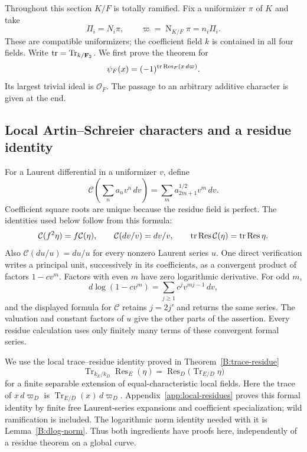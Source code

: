 \documentclass[11pt]{amsart}
\theoremstyle{definition}
\theoremstyle{remark}
\newcommand{\F}{\mathbf F}
\newcommand{\Tr}{\operatorname{Tr}}
\newcommand{\Nm}{\operatorname{N}}
\newcommand{\Res}{\operatorname{Res}}
\newcommand{\OO}{\mathcal O}\newcommand{\pp}{\mathfrak p}\newcommand{\PP}{\mathfrak P}
\newcommand{\Cart}{\mathcal C}\newcommand{\muq}{\mu}
\begin{document}
Throughout this section $K/F$ is totally ramified.
Fix a uniformizer $\pi$ of $K$ and take
\begin{equation}\label{D:EQ:compatiblepi}
 \Pi_i=N_i\pi,\qquad \varpi=\Nm_{K/F}\pi=n_i\Pi_i.
\end{equation}
These are compatible uniformizers; the coefficient field $k$ is contained
in all four fields. Write $\tr=\Tr_{k/\F_2}$.
We first prove the theorem for
\begin{equation}\label{D:EQ:canonicalpsi}
 \psi_F(x)=(-1)^{\tr\Res_F(x\,d\varpi)}.
\end{equation}
Its largest trivial ideal is $\OO_F$. The passage to an arbitrary
additive character is given at the end.

\subsection{Local Artin--Schreier characters and a residue identity}
For a Laurent differential in a uniformizer $v$, define
\[
 \Cart\left(\sum_n a_nv^n\,dv\right)
       =\sum_m a_{2m+1}^{1/2}v^m\,dv.
\]
Coefficient square roots are unique because the residue field is perfect.
The identities used below follow from this formula:
\begin{equation}\label{D:EQ:Cartier}
 \Cart(f^2\eta)=f\Cart(\eta),\qquad
 \Cart(dv/v)=dv/v,\qquad
 \tr\Res\Cart(\eta)=\tr\Res\eta.
\end{equation}
Also $\Cart(du/u)=du/u$ for every nonzero Laurent series $u$.
One direct verification writes a principal unit, successively in its
coefficients, as a convergent product of factors $1-cv^m$.
Factors with even $m$ have zero logarithmic derivative. For odd $m$,
\[
 d\log(1-cv^m)=\sum_{j\ge1}c^jv^{mj-1}\,dv,
\]
and the displayed formula for $\Cart$ retains $j=2j'$ and returns the
same series. The valuation and constant factors of $u$ give the other
parts of the assertion. Every residue calculation uses only finitely
many terms of these convergent formal series.

We use the local trace--residue identity proved in
Theorem~\ref{B:trace-residue}
\begin{equation}\label{D:EQ:residue-trace}
 \Tr_{k_E/k_D}\Res_E(\eta)
       =\Res_D\bigl(\Tr_{E/D}\eta\bigr)
\end{equation}
for a finite separable extension of equal-characteristic local fields.
Here the trace of $x\,d\varpi_D$ is
$\Tr_{E/D}(x)\,d\varpi_D$. Appendix~\ref{app:local-residues}
proves this formal identity by finite free Laurent-series expansions
and coefficient specialization; wild ramification is included.
The logarithmic norm identity needed with it is
Lemma~\ref{B:dlog-norm}. Thus both ingredients have proofs here,
independently of a residue theorem on a global curve.
\end{document}
